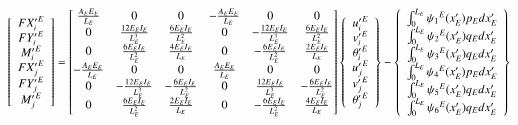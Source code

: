 \documentclass[a4paper]{article}
\begin{document}
{
\renewcommand{\arraystretch}{1.7}
$$
\left[\begin{array}{c}
     {FX'_i}^E  \\ {FY'_i}^E \\ {M'_i}^E \\
     {FX'_j}^E \\ {FY'_j}^E \\ {M'_j}^E
\end{array}\right] = 
\left[\begin{matrix}\frac{A_{E} E_{E}}{L_{E}} & {\footnotesize 0} & {\footnotesize 0} & - \frac{A_{E} E_{E}}{L_{E}} & {\footnotesize 0} & {\footnotesize 0}\\{\footnotesize 0} & \frac{12 E_{E} I_{E}}{L_{E}^{3}} & \frac{6 E_{E} I_{E}}{L_{E}^{2}} & {\footnotesize 0} & - \frac{12 E_{E} I_{E}}{L_{E}^{3}} & \frac{6 E_{E} I_{E}}{L_{E}^{2}}\\{\footnotesize 0} & \frac{6 E_{E} I_{E}}{L_{E}^{2}} & \frac{4 E_{E} I_{E}}{L_{E}} & {\footnotesize 0} & - \frac{6 E_{E} I_{E}}{L_{E}^{2}} & \frac{2 E_{E} I_{E}}{L_{E}}\\- \frac{A_{E} E_{E}}{L_{E}} & {\footnotesize 0} & {\footnotesize 0} & \frac{A_{E} E_{E}}{L_{E}} & {\footnotesize 0} & {\footnotesize 0}\\{\footnotesize 0} & - \frac{12 E_{E} I_{E}}{L_{E}^{3}} & - \frac{6 E_{E} I_{E}}{L_{E}^{2}} & {\footnotesize 0} & \frac{12 E_{E} I_{E}}{L_{E}^{3}} & - \frac{6 E_{E} I_{E}}{L_{E}^{2}}\\{\footnotesize 0} & \frac{6 E_{E} I_{E}}{L_{E}^{2}} & \frac{2 E_{E} I_{E}}{L_{E}} & {\footnotesize 0} & - \frac{6 E_{E} I_{E}}{L_{E}^{2}} & \frac{4 E_{E} I_{E}}{L_{E}}\end{matrix}\right]
\left\{ \begin{array}{c}
{u'_i}^E \\ {v'_i}^E \\ {{\theta}'_i}^E \\
{u'_j}^E  \\ {v'_j}^E \\ {{\theta}'_j}^E 
\end{array} \right\} - 
\left\{ \begin{array}{c}
\int_{0}^{L_E} {{\psi}_1}^E(x'_E)p_E dx'_E \\ \int_{0}^{L_E} {{\psi}_2}^E(x'_E)q_E dx'_E \\ \int_{0}^{L_E} {{\psi}_3}^E(x'_E)q_E dx'_E \\
\int_{0}^{L_E} {{\psi}_4}^E(x'_E)p_E dx'_E  \\ \int_{0}^{L_E} {{\psi}_5}^E(x'_E)q_E dx'_E \\ \int_{0}^{L_E} {{\psi}_6}^E(x'_E)q_E dx'_E 
\end{array} \right\}
$$
}
\end{document}
